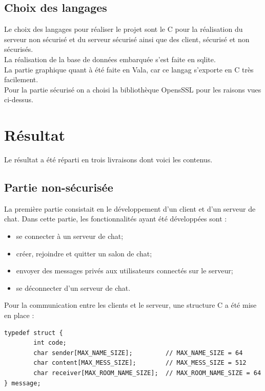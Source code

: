 \documentclass[a4paper,11pt,french]{book}
\begin{document}
\subsection{Choix des langages}
Le choix des langages pour réaliser le projet sont le C pour la réalisation du serveur non sécurisé et du serveur sécurisé ainsi que des client, sécurisé et non sécurisés.\\La réalisation de la base de données embarquée s'est faite en sqlite.\\La partie graphique quant à été faite en Vala, car ce langag s'exporte en C très facilement.\\
Pour la partie sécurisé on a choisi la bibliothèque OpensSSL pour les raisons vues ci-dessus.

\section{Résultat}

Le résultat a été réparti en trois livraisons dont voici les contenus.

\subsection{Partie non-sécurisée}
La première partie consistait en le développement d'un client et d'un serveur de chat. Dans cette partie, les fonctionnalités ayant été développées sont :
\begin{itemize}
\item se connecter à un serveur de chat;
\item créer, rejoindre et quitter un salon de chat;
\item envoyer des messages privés aux utilisateurs connectés sur le serveur;
\item se déconnecter d'un serveur de chat.
\end{itemize}

Pour la communication entre les clients et le serveur, une structure C a été mise en place :

\begin{verbatim}
typedef struct {
        int code;
        char sender[MAX_NAME_SIZE];         // MAX_NAME_SIZE = 64
        char content[MAX_MESS_SIZE];        // MAX_MESS_SIZE = 512
        char receiver[MAX_ROOM_NAME_SIZE];  // MAX_ROOM_NAME_SIZE = 64
} message;
\end{verbatim}
\end{document}
